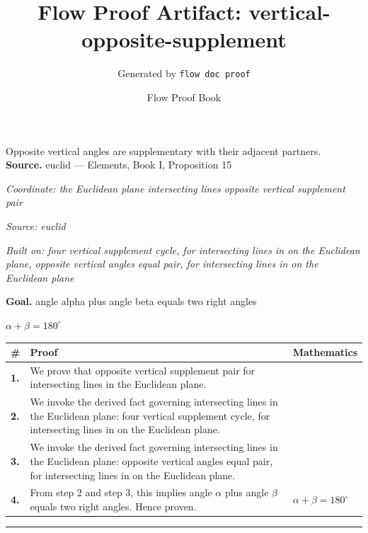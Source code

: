 \documentclass[11pt]{article}
\title{Flow Proof Artifact: vertical-opposite-supplement}
\author{Generated by \texttt{flow doc proof}}
\date{Flow Proof Book}
\theoremstyle{definition}
\begin{document}
\maketitle
Opposite vertical angles are supplementary with their adjacent partners.\\[0.5em]
\textbf{Source.} euclid — Elements, Book I, Proposition 15\\[0.5em]
\bigskip
{}\par
\smallskip\noindent\textit{Coordinate: the Euclidean plane \cdot intersecting lines \cdot opposite vertical supplement pair}\par
\smallskip\noindent\textit{Source: euclid}\par
\smallskip\noindent\textit{Built on: four vertical supplement cycle, for intersecting lines in on the Euclidean plane, opposite vertical angles equal pair, for intersecting lines in on the Euclidean plane}\par
\medskip
\noindent\textbf{Goal.} angle alpha plus angle beta equals two right angles\par
\noindent$\displaystyle \alpha + \beta = 180^\circ$\par
\medskip
\noindent
\begin{tabular}{@{} >{\raggedright\arraybackslash}p{} >{\raggedright\arraybackslash}p{} >{\raggedleft\arraybackslash}p{} @{}}
\textbf{\#} & \textbf{Proof} & \textbf{Mathematics} \\
\midrule
\textbf{1.} & We prove that opposite vertical supplement pair for intersecting lines in the Euclidean plane. & \\[0.45em]
\textbf{2.} & We invoke the derived fact governing intersecting lines in the Euclidean plane: four vertical supplement cycle, for intersecting lines in on the Euclidean plane. & \\[0.45em]
\textbf{3.} & We invoke the derived fact governing intersecting lines in the Euclidean plane: opposite vertical angles equal pair, for intersecting lines in on the Euclidean plane. & \\[0.45em]
\textbf{4.} & From step 2 and step 3, this implies angle $\alpha$ plus angle $\beta$ equals two right angles. Hence proven. & $\displaystyle \alpha + \beta = 180^\circ$ \\[0.45em]
\bottomrule
\end{tabular}
\label{thm:Geometry-intersecting lines-opposite_vertical_supplement_pair}
\par\medskip\hrule
\end{document}
